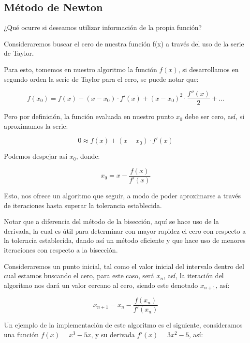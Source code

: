 \subsection{Método de Newton}
¿Qué ocurre si deseamos utilizar información de la propia función?

Consideraremos buscar el cero de nuestra función f(x) a través del uso de la serie de Taylor.

Para esto, tomemos en nuestro algoritmo la función $f(x)$, si desarrollamos en segundo orden la serie de Taylor para el cero, se puede notar que:

\begin{equation}
f(x_0)= f(x) + (x - x_0) \cdot f'(x) + (x - x_0)^2 \cdot \frac{f''(x)}{2} + ...
\end{equation}

Pero por definición, la función evaluada en nuestro punto $x_0$ debe ser cero, así, si aproximamos la serie:

\begin{equation}\label{Taylor_newton_met}
0 \approx f(x) + (x-x_0) \cdot f'(x)
\end{equation}

Podemos despejar así $x_0$, donde:

\begin{equation}
x_0 = x - \frac{f(x)}{f'(x)}
\end{equation}

Esto, nos ofrece un algoritmo que seguir, a modo de poder aproximarse a través de iteraciones hasta superar la tolerancia establecida.

Notar que a diferencia del método de la bisección, aquí se hace uso de la derivada, la cual es útil para determinar con mayor rapidez el cero con respecto a la tolerncia establecida, dando así un método eficiente y que hace uso de menores iteraciones con respecto a la bisección.

Consideraremos un punto inicial, tal como el valor inicial del intervalo dentro del cual estamos buscando el cero, para este caso, será $x_n$, así, la iteración del algoritmo nos dará un valor cercano al cero, siendo este denotado $x_{n+1}$, así:

\begin{equation}
x_{n+1} = x_n - \frac{f(x_n)}{f'(x_n)}
\end{equation}

Un ejemplo de la implementación de este algoritmo es el siguiente, consideramos una función $f(x) = x^3 -  5x$, y su derivada $f'(x) = 3x^2 - 5$, así:

